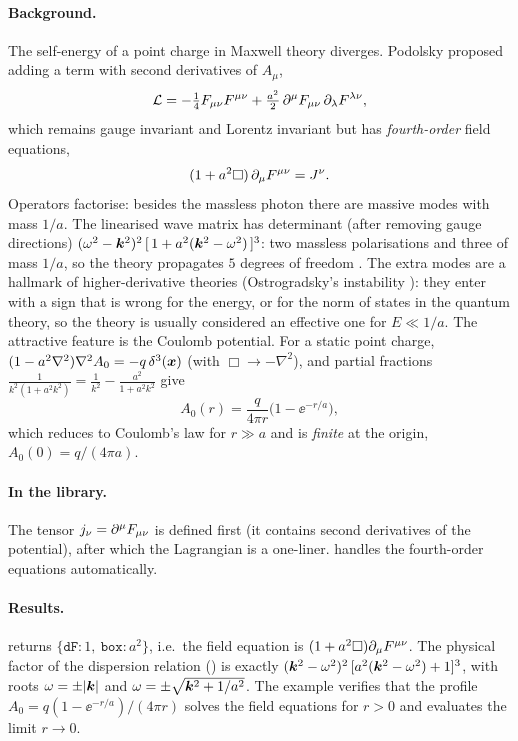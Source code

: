 \paragraph{Background.} The self-energy of a point charge in Maxwell theory diverges. Podolsky \cite{Podolsky1942} proposed adding a term with second derivatives of $A_\mu$,
\begin{equation}
\mathcal L=-\tfrac14F_{\mu\nu}F^{\mu\nu}+\tfrac{a^2}2\,\partial^\mu F_{\mu\nu}\,\partial_\lambda F^{\lambda\nu},
\end{equation}
which remains gauge invariant and Lorentz invariant but has \emph{fourth-order} field equations,
\begin{equation}
(1+a^2\square)\,\partial_\mu F^{\mu\nu}=J^\nu.
\end{equation}
Operators factorise: besides the massless photon there are massive modes with mass $1/a$. The linearised wave matrix has determinant (after removing gauge directions) $(\omega^2-\bm{k}^2)^2\,[\,1+a^2(\bm{k}^2-\omega^2)\,]^3$: two massless polarisations and three of mass $1/a$, so the theory propagates $5$ degrees of freedom \cite{HenneauxTeitelboim}. The extra modes are a hallmark of higher-derivative theories (Ostrogradsky's instability \cite{Ostrogradsky1850,Woodard2007}): they enter with a sign that is wrong for the energy, or for the norm of states in the quantum theory, so the theory is usually considered an effective one for $E\ll1/a$. The attractive feature is the Coulomb potential. For a static point charge, $(1-a^2\nabla^2)\nabla^2A_0=-q\,\delta^3(\bm{x})$ (with $\Box\to-\nabla^2$), and partial fractions $\tfrac1{k^2(1+a^2k^2)}=\tfrac1{k^2}-\tfrac{a^2}{1+a^2k^2}$ give
\begin{equation}
A_0(r)=\frac{q}{4\pi r}\big(1-\ee^{-r/a}\big),
\end{equation}
which reduces to Coulomb's law for $r\gg a$ and is \emph{finite} at the origin, $A_0(0)=q/(4\pi a)$.

\paragraph{In the library.} The tensor $j_\nu=\partial^\mu F_{\mu\nu}$ is defined first (it contains second derivatives of the potential), after which the Lagrangian is a one-liner.  handles the fourth-order equations automatically.


\paragraph{Results.}  returns $\{\texttt{dF}:1,\ \texttt{box}:a^2\}$, i.e.\ the field equation is $(1+a^2\square)\partial_\mu F^{\mu\nu}$. The physical factor of the dispersion relation () is exactly $(\bm{k}^2-\omega^2)^2\,[a^2(\bm{k}^2-\omega^2)+1]^3$, with roots $\omega=\pm|\bm{k}|$ and $\omega=\pm\sqrt{\bm{k}^2+1/a^2}$. The example verifies that the profile $A_0=q(1-\ee^{-r/a})/(4\pi r)$ solves the field equations for $r>0$ and evaluates the limit $r\to0$.

